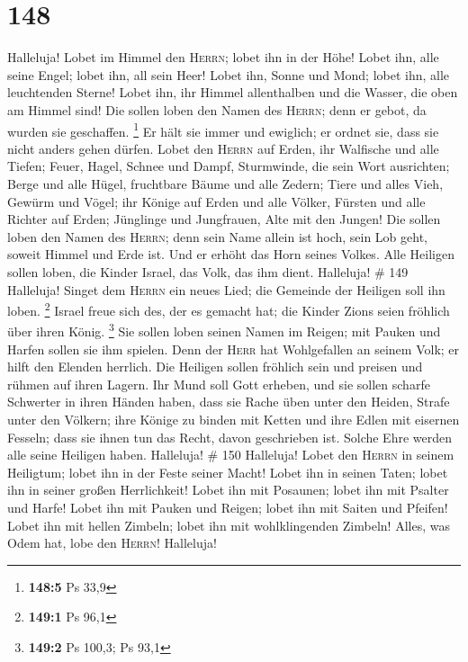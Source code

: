 \hypertarget{section-47}{%
\section{148}\label{section-47}}

 Halleluja! Lobet im Himmel den \textsc{Herrn}; lobet ihn
in der Höhe!  Lobet ihn, alle seine Engel; lobet ihn, all
sein Heer!  Lobet ihn, Sonne und Mond; lobet ihn, alle
leuchtenden Sterne!  Lobet ihn, ihr Himmel allenthalben
und die Wasser, die oben am Himmel sind!  Die sollen loben
den Namen des \textsc{Herrn}; denn er gebot, da wurden sie geschaffen.
\footnote{\textbf{148:5} Ps 33,9}  Er hält sie immer und
ewiglich; er ordnet sie, dass sie nicht anders gehen dürfen.
 Lobet den \textsc{Herrn} auf Erden, ihr Walfische und
alle Tiefen;  Feuer, Hagel, Schnee und Dampf, Sturmwinde,
die sein Wort ausrichten;  Berge und alle Hügel,
fruchtbare Bäume und alle Zedern;  Tiere und alles Vieh,
Gewürm und Vögel;  ihr Könige auf Erden und alle Völker,
Fürsten und alle Richter auf Erden;  Jünglinge und
Jungfrauen, Alte mit den Jungen!  Die sollen loben den
Namen des \textsc{Herrn}; denn sein Name allein ist hoch, sein Lob geht,
soweit Himmel und Erde ist.  Und er erhöht das Horn
seines Volkes. Alle Heiligen sollen loben, die Kinder Israel, das Volk,
das ihm dient. Halleluja! \# 149  Halleluja! Singet dem
\textsc{Herrn} ein neues Lied; die Gemeinde der Heiligen soll ihn loben.
\footnote{\textbf{149:1} Ps 96,1}  Israel freue sich des,
der es gemacht hat; die Kinder Zions seien fröhlich über ihren König.
\footnote{\textbf{149:2} Ps 100,3; Ps 93,1}  Sie sollen
loben seinen Namen im Reigen; mit Pauken und Harfen sollen sie ihm
spielen.  Denn der \textsc{Herr} hat Wohlgefallen an
seinem Volk; er hilft den Elenden herrlich.  Die Heiligen
sollen fröhlich sein und preisen und rühmen auf ihren Lagern.
 Ihr Mund soll Gott erheben, und sie sollen scharfe
Schwerter in ihren Händen haben,  dass sie Rache üben
unter den Heiden, Strafe unter den Völkern;  ihre Könige
zu binden mit Ketten und ihre Edlen mit eisernen Fesseln; 
dass sie ihnen tun das Recht, davon geschrieben ist. Solche Ehre werden
alle seine Heiligen haben. Halleluja! \# 150  Halleluja!
Lobet den \textsc{Herrn} in seinem Heiligtum; lobet ihn in der Feste
seiner Macht!  Lobet ihn in seinen Taten; lobet ihn in
seiner großen Herrlichkeit!  Lobet ihn mit Posaunen; lobet
ihn mit Psalter und Harfe!  Lobet ihn mit Pauken und
Reigen; lobet ihn mit Saiten und Pfeifen!  Lobet ihn mit
hellen Zimbeln; lobet ihn mit wohlklingenden Zimbeln! 
Alles, was Odem hat, lobe den \textsc{Herrn}! Halleluja!
